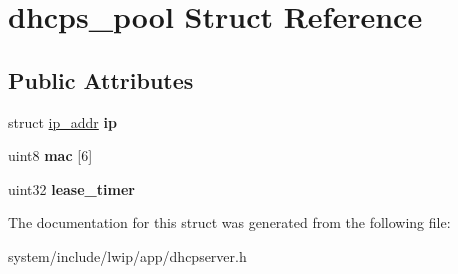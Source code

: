 \hypertarget{structdhcps__pool}{}\section{dhcps\+\_\+pool Struct Reference}
\label{structdhcps__pool}
\subsection*{Public Attributes}
\begin{DoxyCompactItemize}
\item 
\hypertarget{structdhcps__pool_af5df9203d2aa88d46c999e72c58328a1}{}struct \hyperlink{structip__addr}{ip\+\_\+addr} {\bfseries ip}\label{structdhcps__pool_af5df9203d2aa88d46c999e72c58328a1}

\item 
\hypertarget{structdhcps__pool_a637720fc6135600eb84c14ff7f0bb864}{}uint8 {\bfseries mac} \mbox{[}6\mbox{]}\label{structdhcps__pool_a637720fc6135600eb84c14ff7f0bb864}

\item 
\hypertarget{structdhcps__pool_a2c76ad0519e095a759b497b3bd88c34f}{}uint32 {\bfseries lease\+\_\+timer}\label{structdhcps__pool_a2c76ad0519e095a759b497b3bd88c34f}

\end{DoxyCompactItemize}


The documentation for this struct was generated from the following file\+:\begin{DoxyCompactItemize}
\item 
system/include/lwip/app/dhcpserver.\+h\end{DoxyCompactItemize}
